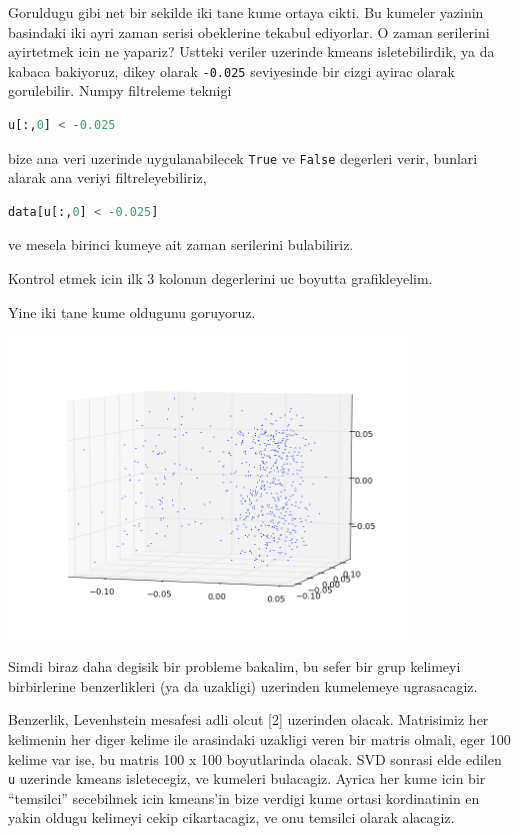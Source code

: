 \documentclass[12pt,fleqn]{article}\usepackage{../common}
\begin{document}
Goruldugu gibi net bir sekilde iki tane kume ortaya cikti. Bu kumeler
yazinin basindaki iki ayri zaman serisi obeklerine tekabul ediyorlar. O
zaman serilerini ayirtetmek icin ne yapariz? Ustteki veriler uzerinde
kmeans isletebilirdik, ya da kabaca bakiyoruz, dikey olarak \verb!-0.025!
seviyesinde bir cizgi ayirac olarak gorulebilir. Numpy filtreleme teknigi 

\begin{lstlisting}[language=Python]
u[:,0] < -0.025
\end{lstlisting}

bize ana veri uzerinde uygulanabilecek \verb!True! ve \verb!False!
degerleri verir, bunlari alarak ana veriyi filtreleyebiliriz,

\begin{lstlisting}[language=Python]
data[u[:,0] < -0.025]
\end{lstlisting}

ve mesela birinci kumeye ait zaman serilerini bulabiliriz. 

Kontrol etmek icin ilk 3 kolonun degerlerini uc boyutta grafikleyelim.



Yine iki tane kume oldugunu goruyoruz. 

\includegraphics[height=8cm]{3d.png}

Simdi biraz daha degisik bir probleme bakalim, bu sefer bir grup kelimeyi
birbirlerine benzerlikleri (ya da uzakligi) uzerinden kumelemeye ugrasacagiz. 

Benzerlik, Levenhstein mesafesi adli olcut [2] uzerinden olacak. Matrisimiz
her kelimenin her diger kelime ile arasindaki uzakligi veren bir matris
olmali, eger 100 kelime var ise, bu matris 100 x 100 boyutlarinda
olacak. SVD sonrasi elde edilen \verb!u! uzerinde kmeans isletecegiz, ve
kumeleri bulacagiz. Ayrica her kume icin bir ``temsilci'' secebilmek icin
kmeans'in bize verdigi kume ortasi kordinatinin en yakin oldugu kelimeyi
cekip cikartacagiz, ve onu temsilci olarak alacagiz.
\end{document}
